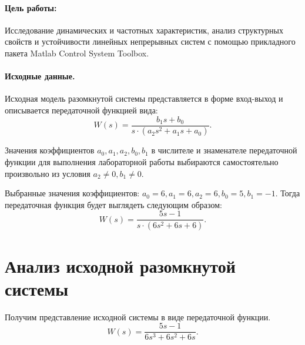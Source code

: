 \documentclass[a4paper,12pt]{article} %
\begin{document}

\setcounter{page}{2}

\paragraph{Цель работы:}Исследование динамических и частотных характеристик, анализ структурных свойств и устойчивости линейных непрерывных систем с помощью прикладного пакета Matlab Control System Toolbox.
\paragraph{Исходные данные.}
Исходная модель разомкнутой системы представляется в форме вход-выход и
описывается передаточной функцией вида:
\begin{equation} 
W(s) = \frac{b_1s+b_0}{s\cdot(a_2s^2+a_1s+a_0)}.
\end{equation}

Значения коэффициентов $a_0, a_1, a_2, b_0, b_1$ в числителе и знаменателе передаточной функции для выполнения лабораторной работы выбираются самостоятельно произвольно из условия $a_2\neq0, b_1\neq0$.\par 
Выбранные значения коэффициентов: $a_0=6, a_1=6, a_2=6, b_0=5, b_1=-1$.
Тогда передаточная функция будет выглядеть следующим образом:
\begin{equation} 
W(s) = \frac{5s-1}{s\cdot(6s^2+6s+6)}.
\end{equation}

\newpage
\section{Анализ исходной разомкнутой системы}
Получим представление исходной системы в виде передаточной функции.
\begin{equation} 
W(s) = \frac{5s-1}{6s^3+6s^2+6s}.
\end{equation}
\end{document}
